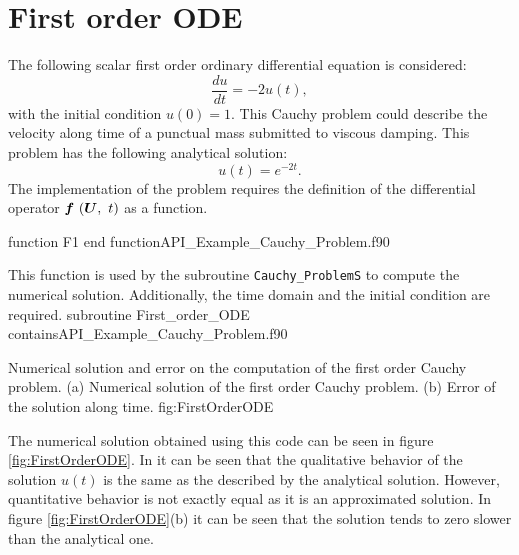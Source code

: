  \section{First order ODE}
 The following scalar first order ordinary differential equation  is considered:
  \begin{equation*}
    \frac{du}{dt} = - 2u(t),
  \end{equation*}
 with the initial condition $u(0)=1$. This Cauchy problem could describe the velocity along time of a punctual mass submitted to viscous damping.
  This problem has the following analytical solution:
 \begin{equation*}
    u(t) = e^{-2t}.
 \end{equation*}
The implementation of the problem requires the definition of the differential operator $ \vect{f}\ (\vect{U},\ t) $ as a function.

\vspace{0.5cm} 
{function F1}
{end function}{API_Example_Cauchy_Problem.f90}

This function is used by the subroutine  \verb|Cauchy_ProblemS| to compute the numerical solution. Additionally, the time domain and the initial condition are required. 
\newpage
\vspace{0.5cm} 
{subroutine First_order_ODE}
{contains}{API_Example_Cauchy_Problem.f90}

          { Numerical solution and error on the computation of the first order Cauchy problem. (a) Numerical solution of the first order Cauchy problem. (b) Error of the solution along time. }{fig:FirstOrderODE}

The numerical solution obtained using this code can be seen in figure \ref{fig:FirstOrderODE}. In it can be seen that the qualitative behavior of the solution $u(t)$ is the same as the described by the analytical solution. However, quantitative behavior is not exactly equal as it is an approximated solution. In figure \ref{fig:FirstOrderODE}(b) it can be seen that the solution tends to zero slower than the analytical one.


\FloatBarrier


